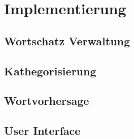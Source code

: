 \section{Implementierung}

	\subsection{Wortschatz Verwaltung}
	\subsection{Kathegorisierung}
	\subsection{Wortvorhersage}
	\subsection{User Interface}
